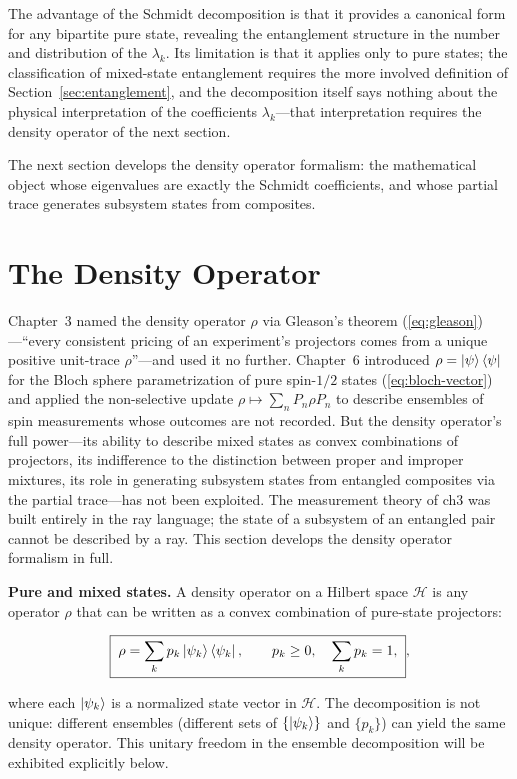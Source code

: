 The advantage of the Schmidt decomposition is that it provides a canonical form for any bipartite pure state, revealing the entanglement structure in the number and distribution of the $\lambda_k$. Its limitation is that it applies only to pure states; the classification of mixed-state entanglement requires the more involved definition of Section~\ref{sec:entanglement}, and the decomposition itself says nothing about the physical interpretation of the coefficients $\lambda_k$---that interpretation requires the density operator of the next section.

The next section develops the density operator formalism: the mathematical object whose eigenvalues are exactly the Schmidt coefficients, and whose partial trace generates subsystem states from composites.
\section{The Density Operator}
\label{sec:density-operator}

Chapter~3 named the density operator $\rho$ via Gleason's theorem (\eqref{eq:gleason})---``every consistent pricing of an experiment's projectors comes from a unique positive unit-trace $\rho$''---and used it no further. Chapter~6 introduced $\rho = \ket{\psi}\bra{\psi}$ for the Bloch sphere parametrization of pure spin-$1/2$ states (\eqref{eq:bloch-vector}) and applied the non-selective update $\rho \mapsto \sum_n P_n \rho P_n$ to describe ensembles of spin measurements whose outcomes are not recorded. But the density operator's full power---its ability to describe mixed states as convex combinations of projectors, its indifference to the distinction between proper and improper mixtures, its role in generating subsystem states from entangled composites via the partial trace---has not been exploited. The measurement theory of ch3 was built entirely in the ray language; the state of a subsystem of an entangled pair cannot be described by a ray. This section develops the density operator formalism in full.

\medskip\noindent\textbf{Pure and mixed states.}
A density operator on a Hilbert space $\mathcal{H}$ is any operator $\rho$ that can be written as a convex combination of pure-state projectors:
\begin{linenomath}
\begin{equation}
\boxed{\;
\rho = \sum_k p_k \ket{\psi_k}\bra{\psi_k},
\qquad
p_k \ge 0,\quad \sum_k p_k = 1,
\;},
\label{eq:density-operator-def}
\end{equation}
\end{linenomath}
where each $\ket{\psi_k}$ is a normalized state vector in $\mathcal{H}$. The decomposition is not unique: different ensembles (different sets of $\{\ket{\psi_k}\}$ and $\{p_k\}$) can yield the same density operator. This unitary freedom in the ensemble decomposition will be exhibited explicitly below.

